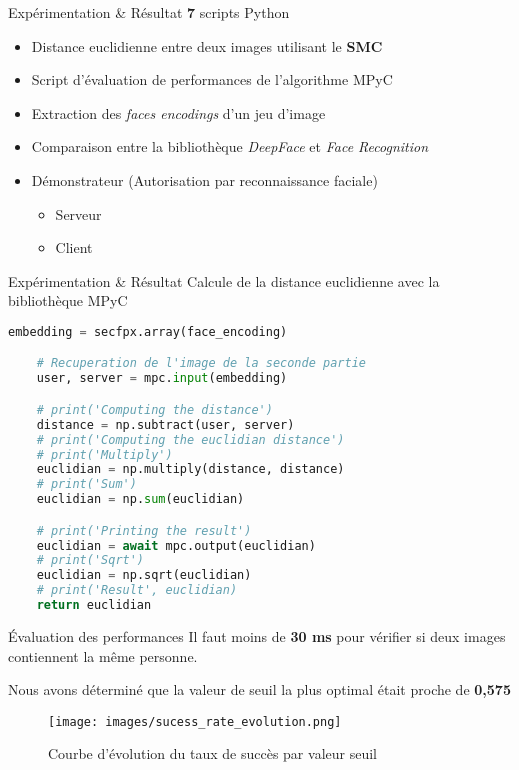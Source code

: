 \documentclass[9pt]{beamer}
\begin{document}
\begin{frame}{Expérimentation \& Résultat}
    \textbf{7} scripts Python
    \begin{itemize}
        \item Distance euclidienne entre deux images utilisant le \textbf{SMC}
        \item Script d'évaluation de performances de l'algorithme MPyC
        \item Extraction des \textit{faces encodings} d'un jeu d'image
        \item Comparaison entre la bibliothèque \textit{DeepFace} et \textit{Face Recognition}
        \item Démonstrateur (Autorisation par reconnaissance faciale)
        \begin{itemize}
            \item Serveur
            \item Client
        \end{itemize}
    \end{itemize}
\end{frame}

\begin{frame}[fragile]{Expérimentation \& Résultat}
    Calcule de la distance euclidienne avec la bibliothèque MPyC
    \begin{scriptsize}
        \begin{lstlisting}[showstringspaces=false, language=python]
    embedding = secfpx.array(face_encoding)

    # Recuperation de l'image de la seconde partie
    user, server = mpc.input(embedding)

    # print('Computing the distance')
    distance = np.subtract(user, server)
    # print('Computing the euclidian distance')
    # print('Multiply')
    euclidian = np.multiply(distance, distance)
    # print('Sum')
    euclidian = np.sum(euclidian)

    # print('Printing the result')
    euclidian = await mpc.output(euclidian)
    # print('Sqrt')
    euclidian = np.sqrt(euclidian)
    # print('Result', euclidian)
    return euclidian
        \end{lstlisting}
    \end{scriptsize}
\end{frame}

\begin{frame}{Évaluation des performances}
    Il faut moins de \textbf{30 ms} pour vérifier si deux images contiennent la même personne.

    Nous avons déterminé que la valeur de seuil la plus optimal était proche de \textbf{0,575}
    \begin{figure}[H]
        \centering
        \texttt{[image: images/sucess\_rate\_evolution.png]}
        \caption{Courbe d'évolution du taux de succès par valeur seuil}
        \label{fig:sucess_rate_evolution}
    \end{figure}
\end{frame}
\end{document}
